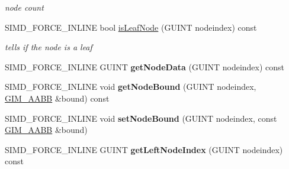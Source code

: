\begin{DoxyCompactItemize}
\begin{DoxyCompactList}\small\item\em node count \end{DoxyCompactList}\item 
\hypertarget{class_g_i_m___b_o_x___t_r_e_e___t_e_m_p_l_a_t_e___s_e_t_a509b1d5bf9af2486aae90e8d56993092}{S\+I\+M\+D\+\_\+\+F\+O\+R\+C\+E\+\_\+\+I\+N\+L\+I\+N\+E bool \hyperlink{class_g_i_m___b_o_x___t_r_e_e___t_e_m_p_l_a_t_e___s_e_t_a509b1d5bf9af2486aae90e8d56993092}{is\+Leaf\+Node} (G\+U\+I\+N\+T nodeindex) const }\label{class_g_i_m___b_o_x___t_r_e_e___t_e_m_p_l_a_t_e___s_e_t_a509b1d5bf9af2486aae90e8d56993092}

\begin{DoxyCompactList}\small\item\em tells if the node is a leaf \end{DoxyCompactList}\item 
\hypertarget{class_g_i_m___b_o_x___t_r_e_e___t_e_m_p_l_a_t_e___s_e_t_ac7dd7d4118f6ce3a18b28d963d5b4709}{S\+I\+M\+D\+\_\+\+F\+O\+R\+C\+E\+\_\+\+I\+N\+L\+I\+N\+E G\+U\+I\+N\+T {\bfseries get\+Node\+Data} (G\+U\+I\+N\+T nodeindex) const }\label{class_g_i_m___b_o_x___t_r_e_e___t_e_m_p_l_a_t_e___s_e_t_ac7dd7d4118f6ce3a18b28d963d5b4709}

\item 
\hypertarget{class_g_i_m___b_o_x___t_r_e_e___t_e_m_p_l_a_t_e___s_e_t_a0ee0f13a2c21241e82a9fd0ce1579592}{S\+I\+M\+D\+\_\+\+F\+O\+R\+C\+E\+\_\+\+I\+N\+L\+I\+N\+E void {\bfseries get\+Node\+Bound} (G\+U\+I\+N\+T nodeindex, \hyperlink{class_g_i_m___a_a_b_b}{G\+I\+M\+\_\+\+A\+A\+B\+B} \&bound) const }\label{class_g_i_m___b_o_x___t_r_e_e___t_e_m_p_l_a_t_e___s_e_t_a0ee0f13a2c21241e82a9fd0ce1579592}

\item 
\hypertarget{class_g_i_m___b_o_x___t_r_e_e___t_e_m_p_l_a_t_e___s_e_t_aeb9993cf71068d07c9b12dae5157c76c}{S\+I\+M\+D\+\_\+\+F\+O\+R\+C\+E\+\_\+\+I\+N\+L\+I\+N\+E void {\bfseries set\+Node\+Bound} (G\+U\+I\+N\+T nodeindex, const \hyperlink{class_g_i_m___a_a_b_b}{G\+I\+M\+\_\+\+A\+A\+B\+B} \&bound)}\label{class_g_i_m___b_o_x___t_r_e_e___t_e_m_p_l_a_t_e___s_e_t_aeb9993cf71068d07c9b12dae5157c76c}

\item 
\hypertarget{class_g_i_m___b_o_x___t_r_e_e___t_e_m_p_l_a_t_e___s_e_t_a5ffb3b1487104a563ac91421c6dd72a9}{S\+I\+M\+D\+\_\+\+F\+O\+R\+C\+E\+\_\+\+I\+N\+L\+I\+N\+E G\+U\+I\+N\+T {\bfseries get\+Left\+Node\+Index} (G\+U\+I\+N\+T nodeindex) const }\label{class_g_i_m___b_o_x___t_r_e_e___t_e_m_p_l_a_t_e___s_e_t_a5ffb3b1487104a563ac91421c6dd72a9}


\end{DoxyCompactItemize}
